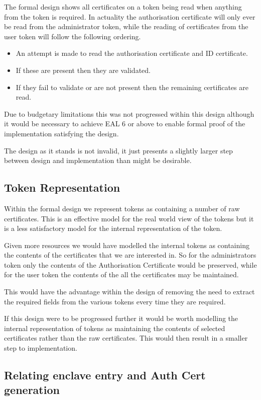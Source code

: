 The formal design shows all certificates on a token being read when
anything from the token is required. In actuality the authorisation
certificate will only ever be read from the administrator token, while
the reading of certificates from the user token will follow the
following ordering.
\begin{itemize}
\item
An attempt is made to read the authorisation certificate and ID certificate.
\item
If these are present then they are validated.
\item 
If they fail to validate or are not present then the remaining 
certificates are read.
\end{itemize}
Due to budgetary limitations this was not progressed within this
 design although it would be necessary to achieve EAL 6 or above to
 enable formal proof of the implementation satisfying the design. 

The design as it stands is not invalid, it just presents a slightly
larger step between design and implementation than might be desirable.

\subsection{Token Representation}
Within the formal design we represent tokens as containing a number of raw 
certificates. This is an effective model for the real world view of
the tokens but it is a  
less satisfactory model for the internal representation of the token.

Given more resources we would have modelled the internal tokens as
containing the contents of the certificates that we are interested
in. 
So for the administrators token  
only the contents of the Authorisation Certificate would be preserved,
while for the user token the contents of the all the certificates may
be maintained. 

This would have the advantage within the design of removing the need
to extract the required fields from the various tokens every time they 
are required.

If this design were to be progressed further it would be worth
modelling the internal  
representation of tokens as maintaining the contents of selected
certificates rather than  
the raw certificates. This would then result in a smaller step to
implementation. 

\subsection{Relating enclave entry and Auth Cert generation}

